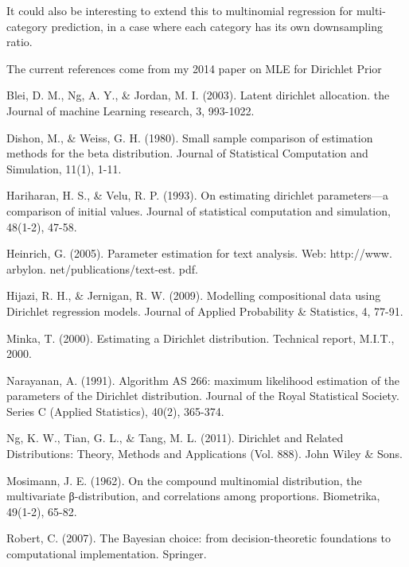 \documentclass[twoside]{article}
\begin{document}
It could also be interesting to extend this to multinomial regression for multi-category prediction, in a case where each category has its own downsampling ratio.

The current references come from my 2014 paper on MLE for Dirichlet Prior


\begin{thebibliography}{20}

Blei, D. M., Ng, A. Y., \& Jordan, M. I. (2003). Latent dirichlet allocation. the Journal of machine Learning research, 3, 993-1022.

Dishon, M., \& Weiss, G. H. (1980). Small sample comparison of estimation methods for the beta distribution. Journal of Statistical Computation and Simulation, 11(1), 1-11.

Hariharan, H. S., \& Velu, R. P. (1993). On estimating dirichlet parameters—a comparison of initial values. Journal of statistical computation and simulation, 48(1-2), 47-58.

Heinrich, G. (2005). Parameter estimation for text analysis. Web: http://www. arbylon. net/publications/text-est. pdf.

Hijazi, R. H., \& Jernigan, R. W. (2009). Modelling compositional data using Dirichlet regression models. Journal of Applied Probability \& Statistics, 4, 77-91.

Minka, T. (2000). Estimating a Dirichlet distribution. Technical report, M.I.T., 2000.

Narayanan, A. (1991). Algorithm AS 266: maximum likelihood estimation of the parameters of the Dirichlet distribution. Journal of the Royal Statistical Society. Series C (Applied Statistics), 40(2), 365-374.

Ng, K. W., Tian, G. L., \& Tang, M. L. (2011). Dirichlet and Related Distributions: Theory, Methods and Applications (Vol. 888). John Wiley \& Sons.

Mosimann, J. E. (1962). On the compound multinomial distribution, the multivariate β-distribution, and correlations among proportions. Biometrika, 49(1-2), 65-82.

Robert, C. (2007). The Bayesian choice: from decision-theoretic foundations to computational implementation. Springer.


\end{thebibliography}
\end{document}
